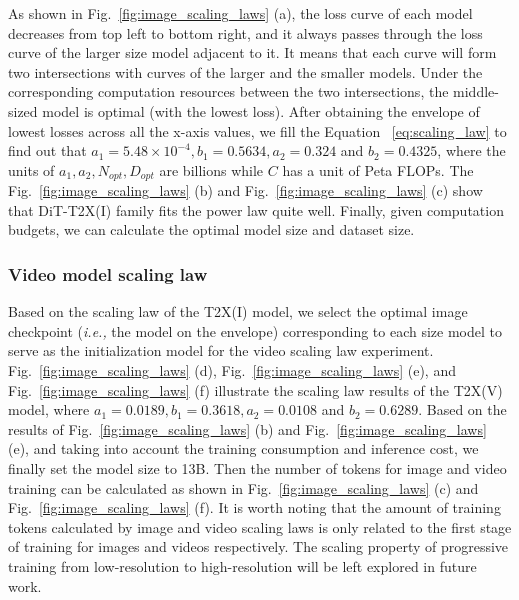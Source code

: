 As shown in Fig.~\ref{fig:image_scaling_laws} (a), the loss curve of each model decreases from top left to bottom right, and it always passes through the loss curve of the larger size model adjacent to it. It means that each curve will form two intersections with curves of the larger and the smaller models. Under the corresponding computation resources between the two intersections, the middle-sized model is optimal (with the lowest loss). After obtaining the envelope of lowest losses across all the x-axis values, we fill the Equation ~\eqref{eq:scaling_law} to find out that $a_1=5.48\times10^{-4}, b_1=0.5634, a_2=0.324$ and $b_2=0.4325$, where the units of $a_1, a_2, N_{opt}, D_{opt}$ are billions while $C$ has a unit of Peta FLOPs. The Fig.~\ref{fig:image_scaling_laws} (b) and Fig.~\ref{fig:image_scaling_laws} (c) show that DiT-T2X(I) family fits the power law quite well. Finally, given computation budgets, we can calculate the optimal model size and dataset size. 

\subsubsection{Video model scaling law}
Based on the scaling law of the T2X(I) model, we select the optimal image checkpoint (\textit{i.e.,} the model on the envelope) corresponding to each size model to serve as the initialization model for the video scaling law experiment. Fig.~\ref{fig:image_scaling_laws} (d), Fig.~\ref{fig:image_scaling_laws} (e), and Fig.~\ref{fig:image_scaling_laws} (f) illustrate the scaling law results of the T2X(V) model, where $a_1=0.0189, b_1=0.3618, a_2=0.0108$ and $b_2=0.6289$.
Based on the results of Fig.~\ref{fig:image_scaling_laws} (b) and Fig.~\ref{fig:image_scaling_laws} (e), and taking into account the training consumption and inference cost, we finally set the model size to 13B. Then the number of tokens for image and video training can be calculated as shown in Fig.~\ref{fig:image_scaling_laws} (c) and Fig.~\ref{fig:image_scaling_laws} (f). It is worth noting that the amount of training tokens calculated by image and video scaling laws is only related to the first stage of training for images and videos respectively. The scaling property of progressive training from low-resolution to high-resolution will be left explored in future work.




